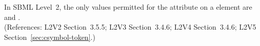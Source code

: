 In SBML Level~2, the only values permitted for the
 attribute on a  element are
 and
.\\
(References: L2V2 Section~3.5.5; L2V3 Section~3.4.6; L2V4 Section~3.4.6; 
L2V5 Section~\ref{sec:csymbol-token}.)
